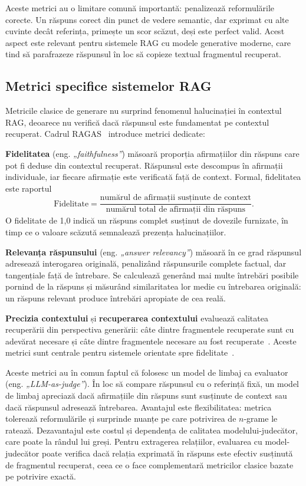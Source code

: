 Aceste metrici au o limitare comună importantă: penalizează reformulările corecte. Un răspuns corect din punct de vedere semantic, dar exprimat cu alte cuvinte decât referința, primește un scor scăzut, deși este perfect valid. Acest aspect este relevant pentru sistemele RAG cu modele generative moderne, care tind să parafrazeze răspunsul în loc să copieze textual fragmentul recuperat.

\subsection{Metrici specifice sistemelor RAG}

Metricile clasice de generare nu surprind fenomenul halucinației în contextul RAG, deoarece nu verifică dacă răspunsul este fundamentat pe contextul recuperat. Cadrul RAGAS~\cite{es2024ragas} introduce metrici dedicate:

\textbf{Fidelitatea} (eng. \textit{„faithfulness”}) măsoară proporția afirmațiilor din răspuns care pot fi deduse din contextul recuperat. Răspunsul este descompus în afirmații individuale, iar fiecare afirmație este verificată față de context. Formal, fidelitatea este raportul
\begin{equation}
\text{Fidelitate} = \frac{\text{numărul de afirmații susținute de context}}{\text{numărul total de afirmații din răspuns}}.
\label{eq:faithfulness}
\end{equation}
O fidelitate de 1,0 indică un răspuns complet susținut de dovezile furnizate, în timp ce o valoare scăzută semnalează prezența halucinațiilor.

\textbf{Relevanța răspunsului} (eng. \textit{„answer relevancy”}) măsoară în ce grad răspunsul adresează interogarea originală, penalizând răspunsurile complete factual, dar tangențiale față de întrebare. Se calculează generând mai multe întrebări posibile pornind de la răspuns și măsurând similaritatea lor medie cu întrebarea originală: un răspuns relevant produce întrebări apropiate de cea reală.

\textbf{Precizia contextului} și \textbf{recuperarea contextului} evaluează calitatea recuperării din perspectiva generării: câte dintre fragmentele recuperate sunt cu adevărat necesare și câte dintre fragmentele necesare au fost recuperate~\cite{es2024ragas}. Aceste metrici sunt centrale pentru sistemele orientate spre fidelitate~\cite{asai2023self}.

Aceste metrici au în comun faptul că folosesc un model de limbaj ca evaluator (eng. \textit{„LLM-as-judge”}). În loc să compare răspunsul cu o referință fixă, un model de limbaj apreciază dacă afirmațiile din răspuns sunt susținute de context sau dacă răspunsul adresează întrebarea. Avantajul este flexibilitatea: metrica tolerează reformulările și surprinde nuanțe pe care potrivirea de $n$-grame le ratează. Dezavantajul este costul și dependența de calitatea modelului-judecător, care poate la rândul lui greși. Pentru extragerea relațiilor, evaluarea cu model-judecător poate verifica dacă relația exprimată în răspuns este efectiv susținută de fragmentul recuperat, ceea ce o face complementară metricilor clasice bazate pe potrivire exactă.

